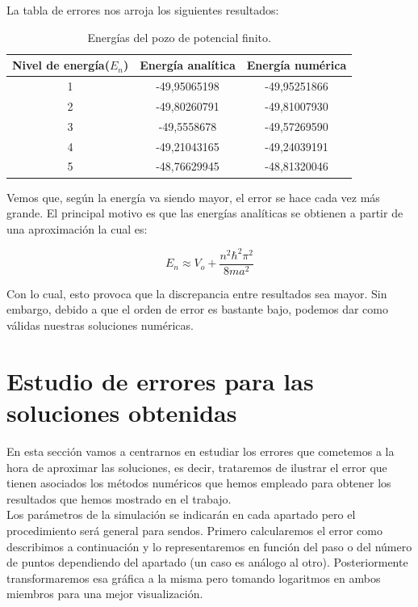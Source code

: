 \documentclass[12pt]{article}
\begin{document}
La tabla de errores nos arroja los siguientes resultados:
\begin{table}[H]
    \centering
    \begin{tabular}{|c||c||c|}
    \hline
    Nivel de energía($E_n$) & Energía analítica & Energía numérica \\
    \hline \hline 
    1 & -49,95065198 & -49,95251866  \\
    \hline
    2 & -49,80260791 & -49,81007930  \\
    \hline
    3 & -49,5558678 & -49,57269590   \\
    \hline
    4 & -49,21043165 & -49,24039191  \\
    \hline
    5 & -48,76629945 & -48,81320046  \\
    \hline
    \end{tabular}
    \caption{Energías del pozo de potencial finito.}
 \end{table}
 
Vemos que, según la energía va siendo mayor, el error se hace 
cada vez más grande. El principal motivo es que las energías analíticas se obtienen a partir de una aproximación la cual es:

\begin{equation*}
    \boxed{E_n\approx V_o+\frac{n^2\hbar^2\pi^2}{8ma^2}}
\end{equation*}

Con lo cual, esto provoca que la discrepancia entre resultados sea mayor. Sin embargo, debido a que el orden de error es bastante bajo, podemos dar como válidas nuestras soluciones numéricas.

\newpage
\section{Estudio de errores para las soluciones obtenidas}
\label{sec:errores}

En esta sección vamos a centrarnos en estudiar los errores que cometemos a la hora de aproximar las soluciones, es decir, trataremos de ilustrar el error que tienen asociados los métodos numéricos que hemos empleado para obtener los resultados que hemos mostrado en el trabajo.\\

Los parámetros de la simulación se indicarán en cada apartado pero el procedimiento será general para sendos. Primero calcularemos el error como describimos a continuación y lo representaremos en función del paso o del número de puntos dependiendo del apartado (un caso es análogo al otro). Posteriormente transformaremos esa gráfica a la misma pero tomando logaritmos en ambos miembros para una mejor visualización.\\ 
\end{document}
